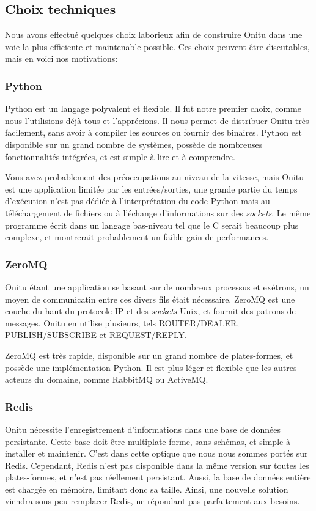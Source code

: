 \documentclass[letterpaper,10pt,english]{sphinxmanual}
\begin{document}
\subsection{Choix techniques}
\label{intro:logbook}\label{intro:technical-choices}
Nous avons effectué quelques choix laborieux afin de construire Onitu dans une voie la plus efficiente et maintenable possible. Ces choix peuvent être discutables, mais en voici nos motivations:


\subsubsection{Python}
\label{intro:python}
Python est un langage polyvalent et flexible. Il fut notre premier choix, comme nous l'utilisions déjà tous et l'apprécions. Il nous permet de distribuer Onitu très facilement, sans avoir à compiler les sources ou fournir des binaires. Python est disponible sur un grand nombre de systèmes, possède de nombreuses fonctionnalités intégrées, et est simple à lire et à comprendre.

Vous avez probablement des préoccupations au niveau de la vitesse, mais Onitu est une application limitée par les entrées/sorties, une grande partie du temps d'exécution n'est pas dédiée à l'interprétation du code Python mais au téléchargement de fichiers ou à l'échange d'informations sur des \emph{sockets}. Le même programme écrit dans un langage bas-niveau tel que le C serait beaucoup plus complexe, et montrerait probablement un faible gain de performances.


\subsubsection{ZeroMQ}
\label{intro:zeromq}
Onitu étant une application se basant sur de nombreux processus et exétrons, un moyen de communicatin entre ces divers fils était nécessaire. ZeroMQ est une couche du haut du protocole IP et des \emph{sockets} Unix, et fournit des patrons de messages. Onitu en utilise plusieurs, tels ROUTER/DEALER, PUBLISH/SUBSCRIBE et REQUEST/REPLY.

ZeroMQ est très rapide, disponible sur un grand nombre de plates-formes, et possède une implémentation Python. Il est plus léger et flexible que les autres acteurs du domaine, comme RabbitMQ ou ActiveMQ.


\subsubsection{Redis}
\label{intro:redis}
Onitu nécessite l'enregistrement d'informations dans une base de données persistante. Cette base doit être multiplate-forme, sans schémas, et simple à installer et maintenir. C'est dans cette optique que nous nous sommes portés sur Redis. Cependant, Redis n'est pas disponible dans la même version sur toutes les plates-formes, et n'est pas réellement persistant. Aussi, la base de données entière est chargée en mémoire, limitant donc sa taille. Ainsi, une nouvelle solution viendra sous peu remplacer Redis, ne répondant pas parfaitement aux besoins.
\end{document}
